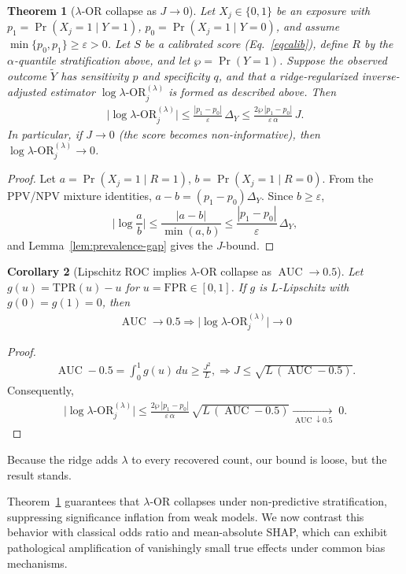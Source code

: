 \documentclass[pdflatex,sn-mathphys-num]{sn-jnl}%
\def\EQSP{3pt}
\newcommand{\cgather}[2][\EQSP]{\begingroup\setlength\abovedisplayskip{#1}\setlength\belowdisplayskip{#1}\begin{gather} #2 \end{gather}\endgroup\noindent}
\newcommand{\cgathers}[2][\EQSP]{\begingroup\setlength\abovedisplayskip{#1}\setlength\belowdisplayskip{#1}\begin{gather*} #2 \end{gather*}\endgroup\noindent}
\newcommand{\SPOR}{\textrm{$\lambda$-OR}}
\newcommand{\logor}{\log\SPOR}
\newcommand{\AUC}{\operatorname{AUC}}
\theoremstyle{thmstyleone}%
\newtheorem{theorem}{Theorem}%
\newtheorem{corollary}[theorem]{Corollary} %
\theoremstyle{thmstyletwo}%
\theoremstyle{thmstylethree}%
\begin{document}
\begin{theorem}[$\SPOR$ collapse as \(J\to 0\)]\label{thm:SPOR_collapse_J}
Let \(X_j\in\{0,1\}\) be an exposure with
\(p_1=\Pr(X_j{=}1\mid Y{=}1)\), \(p_0=\Pr(X_j{=}1\mid Y{=}0)\),
and assume \(\min\{p_0,p_1\}\ge\varepsilon>0\).
Let \(S\) be a calibrated score (Eq.~\eqref{eqcalib}),
define \(R\) by the \(\alpha\)-quantile stratification above, and let \(\wp=\Pr(Y=1)\).
Suppose the observed outcome \(\tilde Y\) has sensitivity \(p\) and specificity \(q\),
and that a ridge-regularized inverse-adjusted estimator
\(\logor^{(\lambda)}_j\) is formed as described above. 
Then
\cgather{
\big|\logor^{(\lambda)}_j\big|
\le\frac{|p_1-p_0|}{\varepsilon}\,\Delta_Y
\le\frac{2\wp\,|p_1-p_0|}{\varepsilon\,\alpha}\,J.
}
In particular, if \(J\to 0\) (the score becomes non-informative),
then \(\logor^{(\lambda)}_j\to 0\).
\end{theorem}
\begin{proof}
Let \(a=\Pr(X_j{=}1\mid R{=}1)\), \(b=\Pr(X_j{=}1\mid R{=}0)\).
From the PPV/NPV mixture identities,
\(a-b=(p_1-p_0)\Delta_Y\). Since \(b\ge\varepsilon\),
\[
\Big|\log\frac{a}{b}\Big|
\le \frac{|a-b|}{\min(a,b)}
\le \frac{|p_1-p_0|}{\varepsilon}\,\Delta_Y,
\]
and Lemma~\ref{lem:prevalence-gap} gives the \(J\)-bound.
\end{proof}

\begin{corollary}[Lipschitz ROC implies $\SPOR$ collapse as $\AUC\rightarrow 0.5$]\label{cor:auc_lipschitz}
  Let \(g(u)=\mathrm{TPR}(u)-u\) for \(u=\mathrm{FPR}\in[0,1]\).
If \(g\) is \(L\)-Lipschitz with \(g(0)=g(1)=0\), then
\cgathers{
\AUC \rightarrow 0.5 \Rightarrow \big|\logor^{(\lambda)}_j\big| \rightarrow 0
}
\end{corollary}

  \begin{proof}
\cgathers{
\AUC-0.5=\int_0^1 g(u)\,du \ge \frac{J^2}{L},
\Rightarrow 
J \le \sqrt{L\,(\AUC-0.5)}.
}
Consequently,
\cgathers{
\big|\logor^{(\lambda)}_j\big|
\le\frac{2\wp\,|p_1-p_0|}{\varepsilon\,\alpha}\,
\sqrt{L\,(\AUC-0.5)}
\xrightarrow[\AUC\downarrow 0.5]{}\;0.
}
\end{proof}
Because the ridge adds $\lambda$ to every recovered count, our bound is loose, but the result stands.

Theorem~\ref{thm:SPOR_collapse_J} guarantees that $\SPOR$ collapses under non-predictive stratification, suppressing significance inflation from weak models. We now contrast this behavior with classical odds ratio and mean-absolute SHAP, which can exhibit pathological amplification of vanishingly small true effects under common bias mechanisms. 
\end{document}
